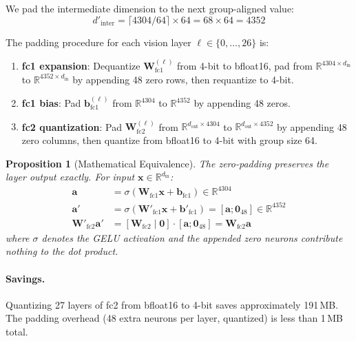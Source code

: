 \documentclass[11pt]{article}
\newcommand{\RR}{\mathbb{R}}
\newtheorem{proposition}{Proposition}
\begin{document}
We pad the intermediate dimension to the next group-aligned value:
\begin{equation}
    d'_{\text{inter}} = \lceil 4304 / 64 \rceil \times 64 = 68 \times 64 = 4352
\end{equation}

The padding procedure for each vision layer $\ell \in \{0, \ldots, 26\}$ is:

\begin{enumerate}[leftmargin=*]
    \item \textbf{fc1 expansion}: Dequantize $\mathbf{W}_{\text{fc1}}^{(\ell)}$ from 4-bit to bfloat16, pad from $\RR^{4304 \times d_{\text{in}}}$ to $\RR^{4352 \times d_{\text{in}}}$ by appending 48 zero rows, then requantize to 4-bit.
    \item \textbf{fc1 bias}: Pad $\mathbf{b}_{\text{fc1}}^{(\ell)}$ from $\RR^{4304}$ to $\RR^{4352}$ by appending 48 zeros.
    \item \textbf{fc2 quantization}: Pad $\mathbf{W}_{\text{fc2}}^{(\ell)}$ from $\RR^{d_{\text{out}} \times 4304}$ to $\RR^{d_{\text{out}} \times 4352}$ by appending 48 zero columns, then quantize from bfloat16 to 4-bit with group size 64.
\end{enumerate}

\begin{proposition}[Mathematical Equivalence]
The zero-padding preserves the layer output exactly. For input $\mathbf{x} \in \RR^{d_{\text{in}}}$:
\begin{align}
    \mathbf{a} &= \sigma(\mathbf{W}_{\text{fc1}} \mathbf{x} + \mathbf{b}_{\text{fc1}}) \in \RR^{4304} \\
    \mathbf{a}' &= \sigma(\mathbf{W}'_{\text{fc1}} \mathbf{x} + \mathbf{b}'_{\text{fc1}}) = [\mathbf{a}; \mathbf{0}_{48}] \in \RR^{4352} \\
    \mathbf{W}'_{\text{fc2}} \mathbf{a}' &= [\mathbf{W}_{\text{fc2}} \mid \mathbf{0}] \cdot [\mathbf{a}; \mathbf{0}_{48}] = \mathbf{W}_{\text{fc2}} \mathbf{a}
\end{align}
where $\sigma$ denotes the GELU activation and the appended zero neurons contribute nothing to the dot product.
\end{proposition}

\paragraph{Savings.} Quantizing 27 layers of fc2 from bfloat16 to 4-bit saves approximately 191\,MB. The padding overhead (48 extra neurons per layer, quantized) is less than 1\,MB total.
\end{document}
